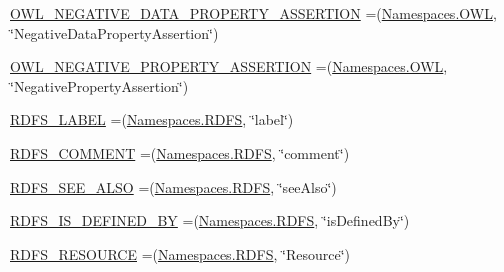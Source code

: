 \begin{DoxyCompactItemize}
\item 
\hyperlink{enumorg_1_1semanticweb_1_1owlapi_1_1vocab_1_1_o_w_l_r_d_f_vocabulary_ae5751721b0db982bd94c81c92784398b}{O\-W\-L\-\_\-\-N\-E\-G\-A\-T\-I\-V\-E\-\_\-\-D\-A\-T\-A\-\_\-\-P\-R\-O\-P\-E\-R\-T\-Y\-\_\-\-A\-S\-S\-E\-R\-T\-I\-O\-N} =(\hyperlink{enumorg_1_1semanticweb_1_1owlapi_1_1vocab_1_1_namespaces_a2fcb537074d9307ef1356ffb6a5bd6f4}{Namespaces.\-O\-W\-L}, \char`\"{}Negative\-Data\-Property\-Assertion\char`\"{})
\item 
\hyperlink{enumorg_1_1semanticweb_1_1owlapi_1_1vocab_1_1_o_w_l_r_d_f_vocabulary_a1ceafa904b7d80e678e03aa7df2df63d}{O\-W\-L\-\_\-\-N\-E\-G\-A\-T\-I\-V\-E\-\_\-\-P\-R\-O\-P\-E\-R\-T\-Y\-\_\-\-A\-S\-S\-E\-R\-T\-I\-O\-N} =(\hyperlink{enumorg_1_1semanticweb_1_1owlapi_1_1vocab_1_1_namespaces_a2fcb537074d9307ef1356ffb6a5bd6f4}{Namespaces.\-O\-W\-L}, \char`\"{}Negative\-Property\-Assertion\char`\"{})
\item 
\hyperlink{enumorg_1_1semanticweb_1_1owlapi_1_1vocab_1_1_o_w_l_r_d_f_vocabulary_aa56a88de62eed425752ddb215e6449a3}{R\-D\-F\-S\-\_\-\-L\-A\-B\-E\-L} =(\hyperlink{enumorg_1_1semanticweb_1_1owlapi_1_1vocab_1_1_namespaces_a64d32d1177b8a61cc6da656defd88a5a}{Namespaces.\-R\-D\-F\-S}, \char`\"{}label\char`\"{})
\item 
\hyperlink{enumorg_1_1semanticweb_1_1owlapi_1_1vocab_1_1_o_w_l_r_d_f_vocabulary_abc2eb4c33451c74fd830e8e089387f5e}{R\-D\-F\-S\-\_\-\-C\-O\-M\-M\-E\-N\-T} =(\hyperlink{enumorg_1_1semanticweb_1_1owlapi_1_1vocab_1_1_namespaces_a64d32d1177b8a61cc6da656defd88a5a}{Namespaces.\-R\-D\-F\-S}, \char`\"{}comment\char`\"{})
\item 
\hyperlink{enumorg_1_1semanticweb_1_1owlapi_1_1vocab_1_1_o_w_l_r_d_f_vocabulary_aecb06e142bbe8cab57bf4b978be9ccd1}{R\-D\-F\-S\-\_\-\-S\-E\-E\-\_\-\-A\-L\-S\-O} =(\hyperlink{enumorg_1_1semanticweb_1_1owlapi_1_1vocab_1_1_namespaces_a64d32d1177b8a61cc6da656defd88a5a}{Namespaces.\-R\-D\-F\-S}, \char`\"{}see\-Also\char`\"{})
\item 
\hyperlink{enumorg_1_1semanticweb_1_1owlapi_1_1vocab_1_1_o_w_l_r_d_f_vocabulary_adfbfea22f60e94f6f9df7434fd383998}{R\-D\-F\-S\-\_\-\-I\-S\-\_\-\-D\-E\-F\-I\-N\-E\-D\-\_\-\-B\-Y} =(\hyperlink{enumorg_1_1semanticweb_1_1owlapi_1_1vocab_1_1_namespaces_a64d32d1177b8a61cc6da656defd88a5a}{Namespaces.\-R\-D\-F\-S}, \char`\"{}is\-Defined\-By\char`\"{})
\item 
\hyperlink{enumorg_1_1semanticweb_1_1owlapi_1_1vocab_1_1_o_w_l_r_d_f_vocabulary_a57bbf8853c1d341c70c0ae194c44f46f}{R\-D\-F\-S\-\_\-\-R\-E\-S\-O\-U\-R\-C\-E} =(\hyperlink{enumorg_1_1semanticweb_1_1owlapi_1_1vocab_1_1_namespaces_a64d32d1177b8a61cc6da656defd88a5a}{Namespaces.\-R\-D\-F\-S}, \char`\"{}Resource\char`\"{})

\end{DoxyCompactItemize}
